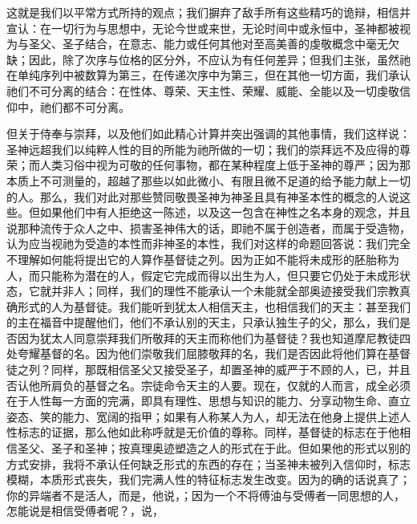 这就是我们以平常方式所持的观点；我们摒弃了敌手所有这些精巧的诡辩，相信并宣认：在一切行为与思想中，无论今世或来世，无论时间中或永恒中，圣神都被视为与圣父、圣子结合，在意志、能力或任何其他对至高美善的虔敬概念中毫无欠缺；因此，除了次序与位格的区分外，不应认为有任何差异；但我们主张，虽然祂在单纯序列中被数算为第三，在传递次序中为第三，但在其他一切方面，我们承认祂们不可分离的结合：在性体、尊荣、天主性、荣耀、威能、全能以及一切虔敬信仰中，祂们都不可分离。\par

但关于侍奉与崇拜，以及他们如此精心计算并突出强调的其他事情，我们这样说：圣神远超我们以纯粹人性的目的所能为祂所做的一切；我们的崇拜远不及应得的尊荣；而人类习俗中视为可敬的任何事物，都在某种程度上低于圣神的尊严；因为那本质上不可测量的，超越了那些以如此微小、有限且微不足道的给予能力献上一切的人。\newline{}那么，我们对此对那些赞同敬畏圣神为神圣且具有神圣本性的概念的人说这些。但如果他们中有人拒绝这一陈述，以及这一包含在神性之名本身的观念，并且说那种流传于众人之中、损害圣神伟大的话，即祂不属于创造者，而属于受造物，认为应当视祂为受造的本性而非神圣的本性，我们对这样的命题回答说：我们完全不理解如何能将提出它的人算作基督徒之列。\newline{}因为正如不能将未成形的胚胎称为人，而只能称为潜在的人，假定它完成而得以出生为人，但只要它仍处于未成形状态，它就并非人；同样，我们的理性不能承认一个未能就全部奥迹接受我们宗教真确形式的人为基督徒。\newline{}我们能听到犹太人相信天主，也相信我们的天主：甚至我们的主在福音中提醒他们，他们不承认别的天主，只承认独生子的父，\newline{}那么，我们是否因为犹太人同意崇拜我们所敬拜的天主而称他们为基督徒？我也知道摩尼教徒四处夸耀基督的名。因为他们崇敬我们屈膝敬拜的名，我们是否因此将他们算在基督徒之列？\newline{}同样，那既相信圣父又接受圣子，却置圣神的威严于不顾的人，已，并且否认他所肩负的基督之名。\newline{}宗徒命令天主的人要。现在，仅就的人而言，成全必须在于人性每一方面的完满，即具有理性、思想与知识的能力、分享动物生命、直立姿态、笑的能力、宽阔的指甲；如果有人称某人为人，却无法在他身上提供上述人性标志的证据，那么他如此称呼就是无价值的尊称。\newline{}同样，基督徒的标志在于他相信圣父、圣子和圣神；按真理奥迹塑造之人的形式在于此。\newline{}但如果他的形式以别的方式安排，我将不承认任何缺乏形式的东西的存在；当圣神未被列入信仰时，标志模糊，本质形式丧失，我们完满人性的特征标志发生改变。\newline{}因为的确的话说真了；你的异端者不是活人，而是，他说，；因为一个不将傅油与受傅者一同思想的人，怎能说是相信受傅者呢？，说，\par

